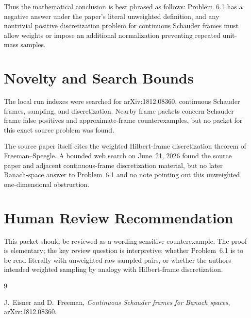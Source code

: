 \documentclass[11pt]{article}
\begin{document}
Thus the mathematical conclusion is best phrased as follows: Problem~6.1 has a
negative answer under the paper's literal unweighted definition, and any
nontrivial positive discretization problem for continuous Schauder frames must
allow weights or impose an additional normalization preventing repeated
unit-mass samples.

\section*{Novelty and Search Bounds}

The local run indexes were searched for arXiv:1812.08360, continuous Schauder
frames, sampling, and discretization. Nearby frame packets concern Schauder
frame false positives and approximate-frame counterexamples, but no packet for
this exact source problem was found.

The source paper itself cites the weighted Hilbert-frame discretization theorem
of Freeman--Speegle. A bounded web search on June~21, 2026 found the source
paper and adjacent continuous-frame discretization material, but no later
Banach-space answer to Problem~6.1 and no note pointing out this unweighted
one-dimensional obstruction.

\section*{Human Review Recommendation}

This packet should be reviewed as a wording-sensitive counterexample. The proof
is elementary; the key review question is interpretive: whether Problem~6.1 is
to be read literally with unweighted raw sampled pairs, or whether the authors
intended weighted sampling by analogy with Hilbert-frame discretization.

\begin{thebibliography}{9}

J.~Eisner and D.~Freeman,
\emph{Continuous Schauder frames for Banach spaces},
arXiv:1812.08360.

\end{thebibliography}
\end{document}
